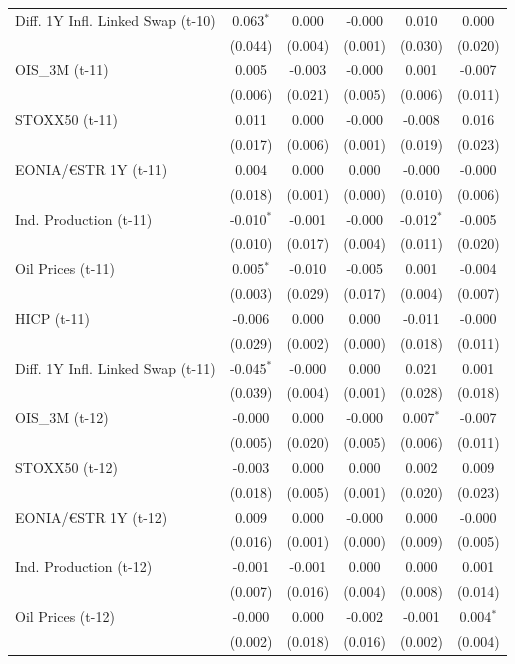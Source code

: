 \begin{longtable}[t]{lccccc}
Diff. 1Y Infl. Linked Swap (t-10) & 0.063$^{*}$ & 0.000 & -0.000 & 0.010 & 0.000\\
 & (0.044) & (0.004) & (0.001) & (0.030) & (0.020)\\
OIS\_3M (t-11) & 0.005 & -0.003 & -0.000 & 0.001 & -0.007\\
 & (0.006) & (0.021) & (0.005) & (0.006) & (0.011)\\
STOXX50 (t-11) & 0.011 & 0.000 & -0.000 & -0.008 & 0.016\\
 & (0.017) & (0.006) & (0.001) & (0.019) & (0.023)\\
EONIA/€STR 1Y (t-11) & 0.004 & 0.000 & 0.000 & -0.000 & -0.000\\
 & (0.018) & (0.001) & (0.000) & (0.010) & (0.006)\\
Ind. Production (t-11) & -0.010$^{*}$ & -0.001 & -0.000 & -0.012$^{*}$ & -0.005\\
 & (0.010) & (0.017) & (0.004) & (0.011) & (0.020)\\
Oil Prices (t-11) & 0.005$^{*}$ & -0.010 & -0.005 & 0.001 & -0.004\\
 & (0.003) & (0.029) & (0.017) & (0.004) & (0.007)\\
HICP (t-11) & -0.006 & 0.000 & 0.000 & -0.011 & -0.000\\
 & (0.029) & (0.002) & (0.000) & (0.018) & (0.011)\\
Diff. 1Y Infl. Linked Swap (t-11) & -0.045$^{*}$ & -0.000 & 0.000 & 0.021 & 0.001\\
 & (0.039) & (0.004) & (0.001) & (0.028) & (0.018)\\
OIS\_3M (t-12) & -0.000 & 0.000 & -0.000 & 0.007$^{*}$ & -0.007\\
 & (0.005) & (0.020) & (0.005) & (0.006) & (0.011)\\
STOXX50 (t-12) & -0.003 & 0.000 & 0.000 & 0.002 & 0.009\\
 & (0.018) & (0.005) & (0.001) & (0.020) & (0.023)\\
EONIA/€STR 1Y (t-12) & 0.009 & 0.000 & -0.000 & 0.000 & -0.000\\
 & (0.016) & (0.001) & (0.000) & (0.009) & (0.005)\\
Ind. Production (t-12) & -0.001 & -0.001 & 0.000 & 0.000 & 0.001\\
 & (0.007) & (0.016) & (0.004) & (0.008) & (0.014)\\
Oil Prices (t-12) & -0.000 & 0.000 & -0.002 & -0.001 & 0.004$^{*}$\\
 & (0.002) & (0.018) & (0.016) & (0.002) & (0.004)\\

\end{longtable}
